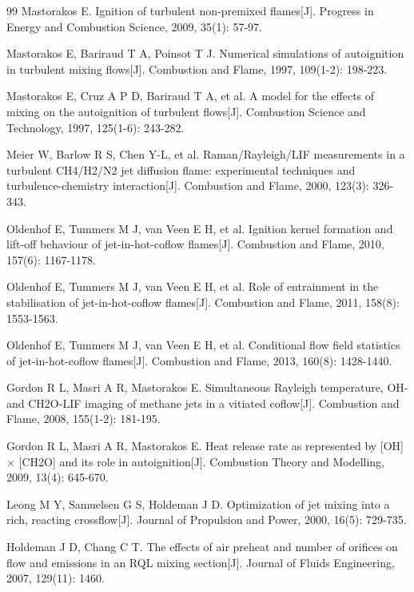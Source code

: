 \documentclass[master]{sdustthesis}  %
\begin{document}
\begin{thebibliography}{99}
	 Mastorakos E. Ignition of turbulent non-premixed flames[J]. Progress in Energy and Combustion Science, 2009, 35(1): 57-97.
	
	 Mastorakos E, Bariraud T A, Poinsot T J. Numerical simulations of autoignition in turbulent mixing flows[J]. Combustion and Flame, 1997, 109(1-2): 198-223.
	
	 Mastorakos E, Cruz A P D, Bariraud T A, et al. A model for the effects of mixing on the autoignition of turbulent flows[J]. Combustion Science and Technology, 1997, 125(1-6): 243-282.
	
	 Meier W, Barlow R S, Chen Y-L, et al. Raman/Rayleigh/LIF measurements in a turbulent CH4/H2/N2 jet diffusion flame: experimental techniques and turbulence-chemistry interaction[J]. Combustion and Flame, 2000, 123(3): 326-343.
	
	 Oldenhof E, Tummers M J, van Veen E H, et al. Ignition kernel formation and lift-off behaviour of jet-in-hot-coflow flames[J]. Combustion and Flame, 2010, 157(6): 1167-1178.
	
	 Oldenhof E, Tummers M J, van Veen E H, et al. Role of entrainment in the stabilisation of jet-in-hot-coflow flames[J]. Combustion and Flame, 2011, 158(8): 1553-1563.
	
	 Oldenhof E, Tummers M J, van Veen E H, et al. Conditional flow field statistics of jet-in-hot-coflow flames[J]. Combustion and Flame, 2013, 160(8): 1428-1440.
	
	 Gordon R L, Masri A R, Mastorakos E. Simultaneous Rayleigh temperature, OH- and CH2O-LIF imaging of methane jets in a vitiated coflow[J]. Combustion and Flame, 2008, 155(1-2): 181-195.
	
	 Gordon R L, Masri A R, Mastorakos E. Heat release rate as represented by [OH] × [CH2O] and its role in autoignition[J]. Combustion Theory and Modelling, 2009, 13(4): 645-670.
	
	 Leong M Y, Samuelsen G S, Holdeman J D. Optimization of jet mixing into a rich, reacting crossflow[J]. Journal of Propulsion and Power, 2000, 16(5): 729-735.
	
	 Holdeman J D, Chang C T. The effects of air preheat and number of orifices on flow and emissions in an RQL mixing section[J]. Journal of Fluids Engineering, 2007, 129(11): 1460.
	

\end{thebibliography}
\end{document}

